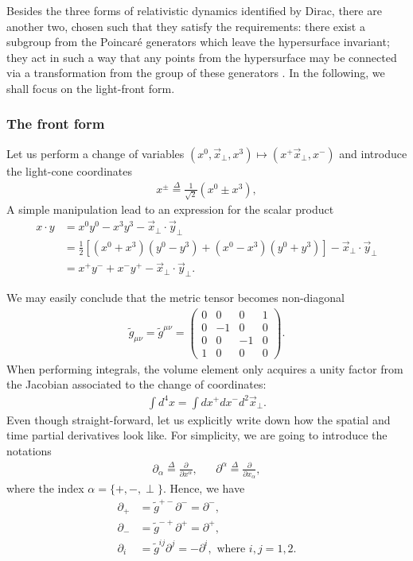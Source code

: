 Besides the three forms of relativistic dynamics identified by Dirac, there are another two, chosen such that they satisfy the requirements: there exist a subgroup from the Poincar\'e generators which leave the hypersurface invariant; they act in such a way that any points from the hypersurface may be connected via a transformation from the group of these generators \cite{heinzl}. In the following, we shall focus on the light-front form. 

\subsubsection*{\sffamily The front form}
Let us perform a change of variables $(x^0,\vec{x}_\perp,x^3)\mapsto (x^+\vec{x}_\perp,x^-)$ and introduce the light-cone coordinates
\begin{align*}
x^\pm\overset{\Delta}{=}\frac{1}{\sqrt{2}}\left(x^0\pm x^3\right),
\end{align*}
A simple manipulation lead to an expression for the scalar product
\begin{align*}
x\cdot y &= x^0y^0-x^3y^3-\vec{x}_\perp\cdot\vec{y}_\perp\\
&=\frac{1}{2}\left[(x^0+x^3)(y^0-y^3)+(x^0-x^3)(y^0+y^3)\right]-\vec{x}_\perp\cdot\vec{y}_\perp\\
&=x^+y^-+x^-y^+-\vec{x}_\perp\cdot\vec{y}_\perp.
\end{align*}

We may easily conclude that the metric tensor becomes non-diagonal
\begin{align*}
\widetilde{g}_{\mu\nu}=\widetilde{g}^{\mu\nu}=
\left( \begin{array}{cccc}
0 & 0  & 0  & 1\\
0 & -1 & 0  & 0\\
0 & 0  & -1 & 0\\
1 & 0  & 0  & 0\end{array} \right).
\end{align*}
When performing integrals, the volume element only acquires a unity factor from the Jacobian associated to the change of coordinates:
\begin{align*}
\int d^4x=\int dx^+dx^-d^2\vec{x}_\perp.
\end{align*}
Even though straight-forward, let us explicitly write down how the spatial and time partial derivatives look like. For simplicity, we are going to introduce the notations
\begin{equation*}
\begin{aligned}
\partial_\alpha\overset{\Delta}{=}\frac{\partial}{\partial x^\alpha}, &&
\partial^\alpha\overset{\Delta}{=}\frac{\partial}{\partial x_\alpha},
\end{aligned}
\end{equation*}
where the index $\alpha=\big\{+,-,\perp\big\}$. Hence, we have
\begin{align*}
\partial_+&=\widetilde{g}^{+-}\partial^-=\partial^-,\\
\partial_-&=\widetilde{g}^{-+}\partial^+=\partial^+,\\
\partial_i&=\widetilde{g}^{ij}\partial^j=-\partial^i, \text{ where }i,j=1,2.
\end{align*}

